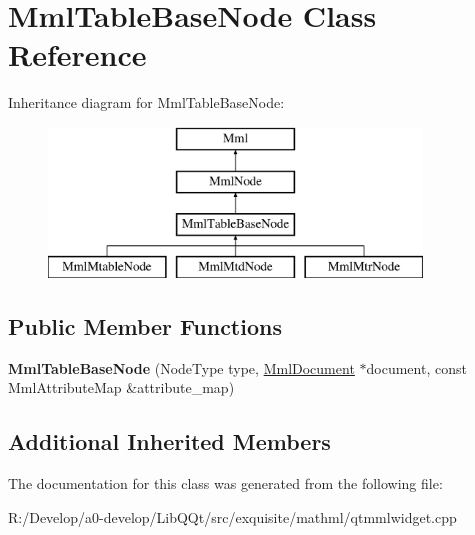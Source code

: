 \hypertarget{class_mml_table_base_node}{}\section{Mml\+Table\+Base\+Node Class Reference}
\label{class_mml_table_base_node}
Inheritance diagram for Mml\+Table\+Base\+Node\+:\begin{figure}[H]
\begin{center}
\leavevmode
\includegraphics[height=4.000000cm]{class_mml_table_base_node}
\end{center}
\end{figure}
\subsection*{Public Member Functions}
\begin{DoxyCompactItemize}
\item 
\mbox{\label{class_mml_table_base_node_abdb8d25cd2891a2304fd2e79ba3fb03c}} 
{\bfseries Mml\+Table\+Base\+Node} (Node\+Type type, \mbox{\hyperlink{class_mml_document}{Mml\+Document}} $\ast$document, const Mml\+Attribute\+Map \&attribute\+\_\+map)
\end{DoxyCompactItemize}
\subsection*{Additional Inherited Members}


The documentation for this class was generated from the following file\+:\begin{DoxyCompactItemize}
\item 
R\+:/\+Develop/a0-\/develop/\+Lib\+Q\+Qt/src/exquisite/mathml/qtmmlwidget.\+cpp\end{DoxyCompactItemize}
